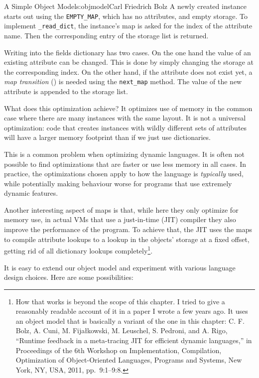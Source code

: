\begin{aosachapter}{A Simple Object Model}{s:objmodel}{Carl Friedrich Bolz}
A newly created instance starts out using the \texttt{EMPTY\_MAP}, which
has no attributes, and empty storage. To implement
\texttt{\_read\_dict}, the instance's map is asked for the index of the
attribute name. Then the corresponding entry of the storage list is
returned.

Writing into the fields dictionary has two cases. On the one hand the
value of an existing attribute can be changed. This is done by simply
changing the storage at the corresponding index. On the other hand, if
the attribute does not exist yet, a \emph{map transition}
() is needed using the
\texttt{next\_map} method. The value of the new attribute is appended to
the storage list.

What does this optimization achieve? It optimizes use of memory in the
common case where there are many instances with the same layout. It is
not a universal optimization: code that creates instances with wildly
different sets of attributes will have a larger memory footprint than if
we just use dictionaries.

This is a common problem when optimizing dynamic languages. It is often
not possible to find optimizations that are faster or use less memory in
all cases. In practice, the optimizations chosen apply to how the
language is \emph{typically} used, while potentially making behaviour
worse for programs that use extremely dynamic features.

Another interesting aspect of maps is that, while here they only
optimize for memory use, in actual VMs that use a just-in-time (JIT)
compiler they also improve the performance of the program. To achieve
that, the JIT uses the maps to compile attribute lookups to a lookup in
the objects' storage at a fixed offset, getting rid of all dictionary
lookups completely\footnote{How that works is beyond the scope of this
  chapter. I tried to give a reasonably readable account of it in a
  paper I wrote a few years ago. It uses an object model that is
  basically a variant of the one in this chapter: C. F. Bolz, A. Cuni,
  M. Fijałkowski, M. Leuschel, S. Pedroni, and A. Rigo, ``Runtime
  feedback in a meta-tracing JIT for efficient dynamic languages,'' in
  Proceedings of the 6th Workshop on Implementation, Compilation,
  Optimization of Object-Oriented Languages, Programs and Systems, New
  York, NY, USA, 2011, pp.~9:1--9:8.}.

\label{potential-extensions}

It is easy to extend our object model and experiment with various
language design choices. Here are some possibilities:


\end{aosachapter}
